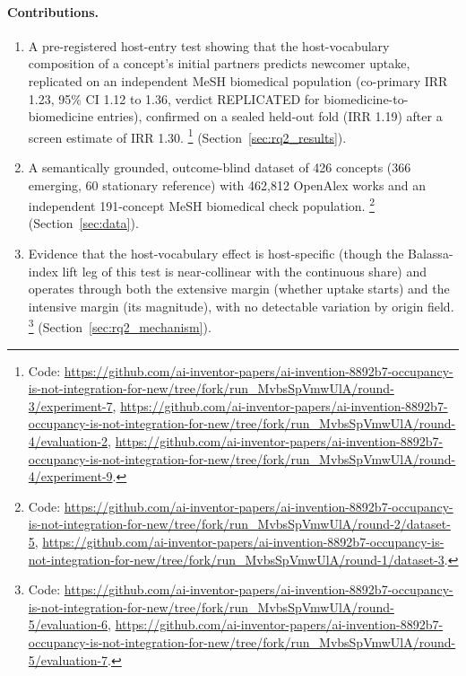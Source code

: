 \documentclass[11pt,letterpaper]{article}
\begin{document}
\paragraph{Contributions.}
\begin{enumerate}
\item A pre-registered host-entry test showing that the host-vocabulary composition of a concept's initial
partners predicts newcomer uptake, replicated on an independent MeSH biomedical population (co-primary
IRR 1.23, 95\% CI 1.12 to 1.36, verdict REPLICATED for biomedicine-to-biomedicine entries), confirmed on a
sealed held-out fold (IRR 1.19) after a screen estimate of IRR 1.30.%
\footnote{Code:
\url{https://github.com/ai-inventor-papers/ai-invention-8892b7-occupancy-is-not-integration-for-new/tree/fork/run_MvbsSpVmwUlA/round-3/experiment-7},
\url{https://github.com/ai-inventor-papers/ai-invention-8892b7-occupancy-is-not-integration-for-new/tree/fork/run_MvbsSpVmwUlA/round-4/evaluation-2},
\url{https://github.com/ai-inventor-papers/ai-invention-8892b7-occupancy-is-not-integration-for-new/tree/fork/run_MvbsSpVmwUlA/round-4/experiment-9}.}
(Section~\ref{sec:rq2_results}).

\item A semantically grounded, outcome-blind dataset of 426 concepts (366 emerging, 60 stationary reference) with 462,812 OpenAlex works
and an independent 191-concept MeSH biomedical check population.%
\footnote{Code:
\url{https://github.com/ai-inventor-papers/ai-invention-8892b7-occupancy-is-not-integration-for-new/tree/fork/run_MvbsSpVmwUlA/round-2/dataset-5},
\url{https://github.com/ai-inventor-papers/ai-invention-8892b7-occupancy-is-not-integration-for-new/tree/fork/run_MvbsSpVmwUlA/round-1/dataset-3}.}
(Section~\ref{sec:data}).

\item Evidence that the host-vocabulary effect is host-specific (though the Balassa-index lift leg of this
test is near-collinear with the continuous share) and operates through both the extensive margin (whether
uptake starts) and the intensive margin (its magnitude), with no detectable variation by origin field.%
\footnote{Code:
\url{https://github.com/ai-inventor-papers/ai-invention-8892b7-occupancy-is-not-integration-for-new/tree/fork/run_MvbsSpVmwUlA/round-5/evaluation-6},
\url{https://github.com/ai-inventor-papers/ai-invention-8892b7-occupancy-is-not-integration-for-new/tree/fork/run_MvbsSpVmwUlA/round-5/evaluation-7}.}
(Section~\ref{sec:rq2_mechanism}).


\end{enumerate}
\end{document}
